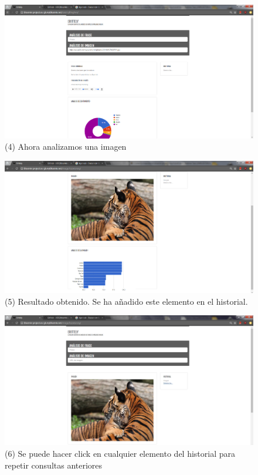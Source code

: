 \documentclass[a4paper]{article}
\begin{document}
\begin{figure}[htp!]
    \centering
    \caption{(4) Ahora analizamos una imagen}
    \label{fig:9}
    \includegraphics[width=\textwidth]{d2}
\end{figure}
\begin{figure}[htp!]
    \centering
    \caption{(5) Resultado obtenido. Se ha añadido este elemento en el historial.}
    \label{fig:10}
    \includegraphics[width=\textwidth]{e2}
\end{figure}
\begin{figure}[htp!]
    \centering
    \caption{(6) Se puede hacer click en cualquier elemento del historial para repetir consultas anteriores}
    \label{fig:11}
    \includegraphics[width=\textwidth]{f2}
\end{figure}
\end{document}
